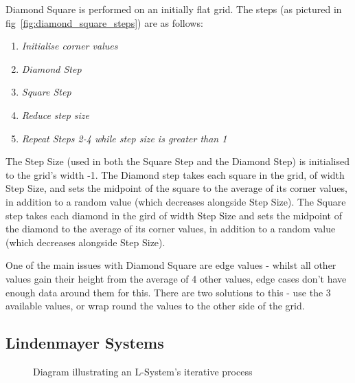 \documentclass[a4paper,10pt]{report}
\begin{document}
Diamond Square is performed on an initially flat grid. The steps (as pictured in fig~\ref{fig:diamond_square_steps}) are as follows:

\begin{enumerate}
\item \textit{Initialise corner values}
\item \textit{Diamond Step}
\item \textit{Square Step}
\item \textit{Reduce step size} 
\item \textit{Repeat Steps 2-4 while step size is greater than 1}
\end{enumerate} 

The Step Size (used in both the Square Step and the Diamond Step) is initialised to the grid's width -1. The Diamond step takes each square in the grid, of width Step Size, and sets the midpoint of the square to the average of its corner values, in addition to a random value (which decreases alongside Step Size). The Square step takes each diamond in the gird of width Step Size and sets the midpoint of the diamond to the average of its corner values, in addition to a random value (which decreases alongside Step Size). \medskip

One of the main issues with Diamond Square are edge values - whilst all other values gain their height from the average of 4 other values, edge cases don't have enough data around them for this. There are two solutions to this - use the 3 available values, or wrap round the values to the other side of the grid. 

\subsection{Lindenmayer Systems}


\begin{figure}
\centering
 \caption{Diagram illustrating an L-System's iterative process}
 \label{fig:l_system_AB}
\end{figure}
\end{document}

